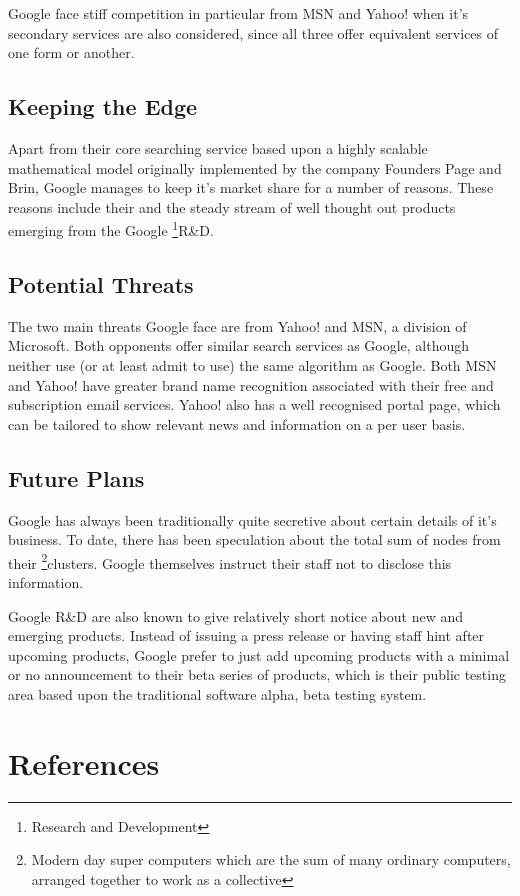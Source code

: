 \documentclass[a4paper,12pt]{article}
\begin{document}
Google face stiff competition in particular from MSN and Yahoo! when
it's secondary services are also considered, since all three offer
equivalent services of one form or another.

\subsection{Keeping the Edge}

Apart from their core searching service based upon a highly scalable
mathematical model originally implemented by the company Founders Page
and Brin, Google manages to keep it's market share for a number of
reasons. These reasons include their \cite[strict beliefs against non text
based advertising]{philosophy} and the steady stream of well thought out
products emerging from the Google \footnote{Research and Development}{R\&D}.

\subsection{Potential Threats}

The two main threats Google face are from Yahoo! and MSN, a division of
Microsoft. Both opponents offer similar search services as Google,
although neither use (or at least admit to use) the same algorithm as 
Google. Both MSN and Yahoo! have greater brand name recognition 
associated with their free and subscription email services. Yahoo! 
also has a well recognised portal page, which can be tailored to show
relevant news and information on a per user basis. 

\subsection{Future Plans}

Google has always been traditionally quite secretive about certain
details of it's business. To date, there has been speculation about the
total sum of nodes from their \footnote{Modern day super computers which
are the sum of many ordinary computers, arranged together to work as a
collective}{clusters}. Google themselves instruct their staff not to
disclose this information.


Google R\&D are also known to give relatively short notice about new and
emerging products. Instead of issuing a press release or having staff
hint after upcoming products, Google prefer to just add upcoming
products with a minimal or no announcement to their beta series
of products, which is their public testing area based upon the
traditional software alpha, beta testing system.

\section{References}




\end{document}

